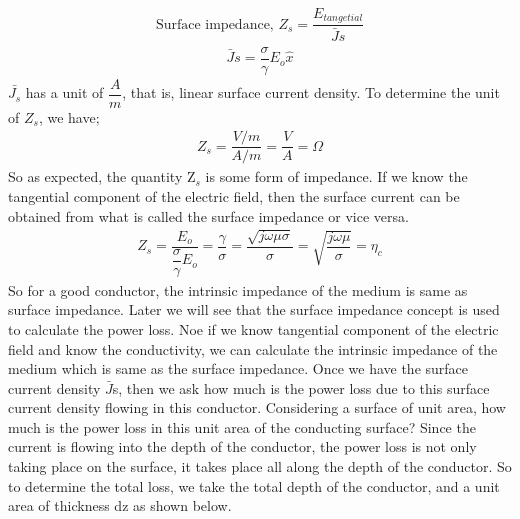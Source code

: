 \begin{align}
\text{Surface impedance, }Z_{s}=\dfrac{E_{tangetial}}{\bar{J}s}
\end{align}
\begin{align}
\bar{J}s=\dfrac{\sigma}{\gamma}E_{o}\hat{x}
\end{align}
$\bar{J_{s}}$ has a unit of $\dfrac{A}{m}$, that is, linear surface current density.
To determine the unit of $Z_{s}$, we have;
\begin{align}
Z_{s}=\dfrac{V/m}{A/m}=\dfrac{V}{A}=\Omega
\end{align}
So as expected, the quantity Z$_{s}$ is some form of impedance. If we know the tangential component of the electric field, then the surface current can be obtained from what is called the surface impedance or vice versa.
\begin{align}
Z_{s}=\dfrac{E_{o}}{\dfrac{\sigma}{\gamma} E_{o}}=\dfrac{\gamma}{\sigma}=\dfrac{\sqrt{j\omega\mu\sigma}}{\sigma}=\sqrt{\dfrac{j\omega\mu}{\sigma}}=\eta_{c}
\end{align}
So for a good conductor, the intrinsic impedance of the medium is same as surface impedance. Later we will see that the surface impedance concept is used to calculate the power loss. Noe if we know tangential component of the electric field and know the conductivity, we can calculate the intrinsic impedance of the medium which is same as the surface impedance.
Once we have the surface current density $\bar{J}$s, then we ask how much is the power loss due to this surface current density flowing in this conductor. Considering a surface of unit area, how much is the power loss in this unit area of the conducting surface? Since the current is flowing into the depth of the conductor, the power loss is not only taking place on the surface, it takes place all along the depth of the conductor. So to determine the total loss, we take the total depth of the conductor, and a unit area of thickness dz as shown below.

